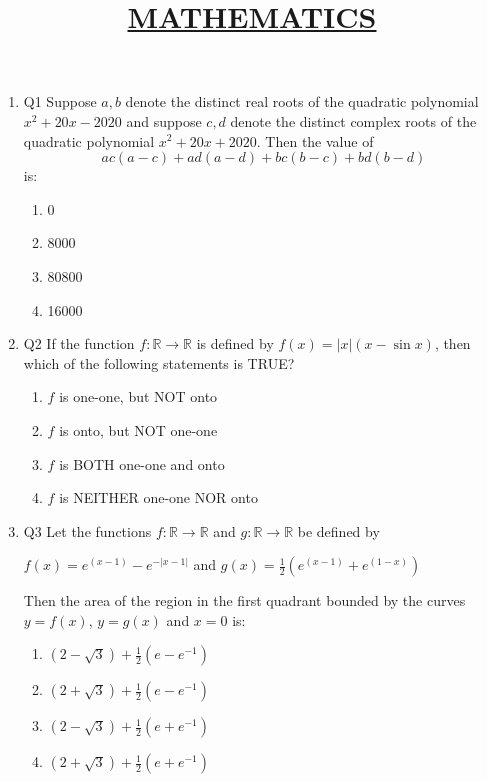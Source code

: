 \documentclass{article}
\title{\underline{\textbf{MATHEMATICS}}}
\date{}
\begin{document}
\maketitle
\begin{enumerate}
    
\item Q1 Suppose $a, b$ denote the distinct real roots of the quadratic polynomial $x^2+20x-2020$ and suppose $c, d$ denote the distinct complex roots of the quadratic polynomial $x^2+20x+2020$. Then the value of
\[
    ac(a-c) + ad(a-d) + bc(b-c) + bd(b-d)
\]
    is:
    
    \begin{enumerate}
        \item  0
        \item  8000
        \item  80800
        \item  16000
    \end{enumerate}

\item Q2 If the function $f: \mathbb{R} \to \mathbb{R}$ is defined by $f(x)=|x|(x-\sin x)$, then which of the following statements is TRUE?

    \begin{enumerate}
        \item  $f$ is one-one, but NOT onto
        \item  $f$ is onto, but NOT one-one
        \item  $f$ is BOTH one-one and onto
        \item  $f$ is NEITHER one-one NOR onto
    \end{enumerate}

\item Q3 Let the functions $f: \mathbb{R} \to \mathbb{R}$ and $g: \mathbb{R} \to \mathbb{R}$ be defined by 

$f(x) = e^{(x - 1)} - e^{- |x - 1|}$ and $ g(x) = \frac{1}{2} \left(e^{(x - 1)} + e^{(1 - x)}\right)$

    Then the area of the region in the first quadrant bounded by the curves $y = f(x)$, $y = g(x)$ and $x = 0$ is:

    \begin{enumerate}
        \item  $(2 - \sqrt{3}) + \frac{1}{2} (e - e^{-1})$
        \item  $(2 + \sqrt{3}) + \frac{1}{2} (e - e^{-1})$
        \item  $(2 - \sqrt{3}) + \frac{1}{2} (e + e^{-1})$
        \item  $(2 + \sqrt{3}) + \frac{1}{2} (e + e^{-1})$
    \end{enumerate}


\end{enumerate}
\end{document}
